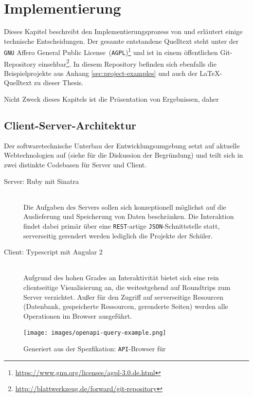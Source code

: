 \section{Implementierung}
\label{sec:implementation-analysis}

Dieses Kapitel beschreibt den Implementierungsprozess von \idename{} und erläutert einige technische Entscheidungen. Der gesamte entstandene Quelltext steht unter der \texttt{GNU} Affero General Public License~(\texttt{AGPL})\footnote{\url{https://www.gnu.org/licenses/agpl-3.0.de.html}} und ist in einem öffentlichen Git-Repository einsehbar\footnote{\url{http://blattwerkzeug.de/forward/git-repository}}. In diesem Repository befinden sich ebenfalls die Beispielprojekte aus Anhang \ref{sec:project-examples} und auch der \LaTeX-Quelltext zu dieser Thesis.

Nicht Zweck dieses Kapitels ist die Präsentation von Ergebnissen, daher

\subsection{Client-Server-Architektur}
\label{sec:implementation-client-server}

Der softwaretechnische Unterbau der Entwicklungsumgebung setzt auf aktuelle Webtechnologien auf (siehe  für die Diskussion der Begründung) und teilt sich in zwei distinkte Codebasen für Server und Client.

\begin{description}
\item[Server: Ruby mit Sinatra] \hfill\\
  Die Aufgaben des Servers sollen sich konzeptionell möglichst auf die Auslieferung und Speicherung von Daten beschränken. Die Interaktion findet dabei primär über eine \texttt{REST}-artige \texttt{JSON}-Schnittstelle statt, serverseitig gerendert werden lediglich die Projekte der Schüler.
\item[Client: Typescript mit Angular 2] \hfill\\
  Aufgrund des hohen Grades an Interaktivität bietet sich eine rein clientseitige Visualisierung an, die weitestgehend auf Roundtrips zum Server verzichtet. Außer für den Zugriff auf serverseitige Resourcen (Datenbank, gespeicherte Ressourcen, gerenderte Seiten) werden alle Operationen im Browser ausgeführt.
\end{description}

\begin{figure}[p]
  \centering \texttt{[image: images/openapi-query-example.png]}
  \caption{Generiert aus der Spezfikation: \texttt{API}-Browser für \idename{}}
  \label{fig:openapi-query-example}
\end{figure}


